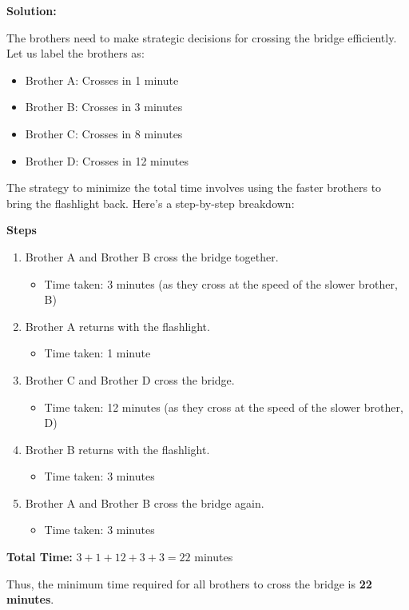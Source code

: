 \begin{airesult}
\vsp

\textbf{Solution:}

The brothers need to make strategic decisions for crossing the bridge
efficiently. Let us label the brothers as:

\begin{itemize}
  \item Brother A: Crosses in 1 minute
  \item Brother B: Crosses in 3 minutes
  \item Brother C: Crosses in 8 minutes
  \item Brother D: Crosses in 12 minutes
\end{itemize}

The strategy to minimize the total time involves using the faster brothers to
bring the flashlight back. Here's a step-by-step breakdown:

\vsp

\textbf{Steps}

\begin{enumerate}
  \item Brother A and Brother B cross the bridge together.
    \begin{itemize}
      \item Time taken: 3 minutes (as they cross at the speed of the slower
brother, B)
    \end{itemize}

  \item Brother A returns with the flashlight.
    \begin{itemize}
      \item Time taken: 1 minute
    \end{itemize}

  \item Brother C and Brother D cross the bridge.
    \begin{itemize}
      \item Time taken: 12 minutes (as they cross at the speed of the slower
brother, D)
    \end{itemize}

  \item Brother B returns with the flashlight.
    \begin{itemize}
      \item Time taken: 3 minutes
    \end{itemize}

  \item Brother A and Brother B cross the bridge again.
    \begin{itemize}
      \item Time taken: 3 minutes
    \end{itemize}
\end{enumerate}

\vsp

\textbf{Total Time:} \(3 + 1 + 12 + 3 + 3 = 22\) minutes

Thus, the minimum time required for all brothers to cross the bridge is
\textbf{22 minutes}.
\end{airesult}

